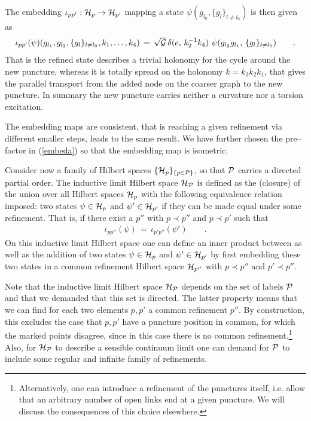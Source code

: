 \documentclass[nofootinbib,superscriptaddress,eqsecnum,tightenlines,11pt]{revtex4-1}
\def\q{\qquad}
\def\ba{\begin{eqnarray}}
\def\ea{\end{eqnarray}}
\begin{document}
The embedding $\iota_{pp'}: {\cal H}_p \rightarrow {\cal H}_{p'}$ mapping a state $\psi(g_{l_0}, \{g_l\}_{l\neq l_0})$ is then given as
\ba\label{embeda}
\iota_{pp'}( \psi) (g_{l_1},g_{l_2}, \{g_l\}_{l\neq l_0}, k_1, \ldots ,k_4) \,=\, \sqrt{{\cal G}} \, \delta(   e,\, k_2^{-1} k_4) \,\, \psi( g_{l_2} g_{l_1} , \, \{ g_l\}_{l\neq l_0}) \q .
\ea  
 That is the refined state describes a trivial holonomy for the cycle around the new puncture, whereas it is totally spread on the holonomy $k=k_3 k_2 k_1$, that gives the parallel transport from the added node on the coarser graph to the new puncture. In summary the new puncture carries neither a curvature nor a torsion excitation. 
 
The embedding maps are consistent, that is reaching a given refinement via different smaller steps, leads to the same result. We have further chosen the pre--factor  in (\ref{embeda}) so that the embedding map is isometric. 

Consider now a family of Hilbert spaces $\{{\cal H}_p\}_{\{p \in {\cal P}\}}$, so that ${\cal P}$ carries a directed partial order.  The inductive limit Hilbert space ${\cal H}_{\cal P}$ is defined as the (closure) of the union over all Hilbert spaces ${\cal H}_p$ with the following equivalence relation imposed: two states $\psi \in {\cal H}_p$ and $\psi' \in {\cal H}_{p'}$ if they can be made equal under some refinement. That is, if there exist a $p''$ with $p\prec p''$ and $p\prec p'$ such that  
\ba
\iota_{pp''}(\psi) \,=\, \iota_{p'p''}(\psi')  \q .
\ea
On this inductive limit Hilbert space one can define an inner product  between as well as the addition of two states $\psi \in {\cal H}_p$ and $\psi' \in {\cal H}_{p'}$ by first embedding these two states in a common refinement Hilbert space ${\cal H}_{p''}$ with $p \prec p''$ and $p' \prec p''$. 


Note that the inductive limit Hilbert space ${\cal H}_{\cal P}$ depends on the set of labels ${\cal P}$ and that we demanded that this set is directed. The latter property means that we can find for each two elements $p,p'$ a common refinement $p''$. By construction, this excludes the case that $p,p'$ have a puncture position in common, for which the marked points disagree, since in this case there is no common refinement.\footnote{Alternatively, one can introduce a refinement of the punctures itself, i.e. allow that an arbitrary number of open links end at a given puncture. We will discuss the consequences of this choice elsewhere.} Also, for ${\cal H}_{\cal P}$ to describe a sensible continuum limit one can demand for ${\cal P}$ to include some regular and infinite family of refinements. 
\end{document}
